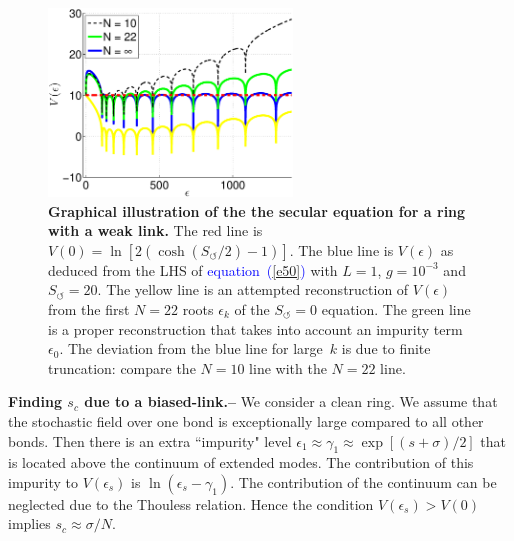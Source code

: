 \documentclass[aps,pre,floats,floatfix,twocolumn]{revtex4}
\newcommand{\Eq}[1]{\textcolor{blue}{{equation}\!~(\ref{#1})}}
\newcommand{\sect}[1]{{\bf #1.-- }}
\begin{document}
\begin{figure}

\includegraphics[height=5cm]{gRing_ES_vs_cont}

\caption{\label{figReconstruction} 
{\bf Graphical illustration of the the secular equation for a ring with a weak link.} 
The red line is $V(0)=\ln[2(\cosh(S_{\circlearrowleft}/2)-1)]$. 
The blue line is $V(\epsilon)$ as deduced from the LHS of \Eq{e50}
with ${L=1}$, ${g=10^{-3}}$ and ${S_{\circlearrowleft}=20}$.
The yellow line is an attempted reconstruction of $V(\epsilon)$ 
from the first $N=22$ roots $\epsilon_k$ of the $S_{\circlearrowleft}{=}0$ equation. 
The green line is a proper reconstruction that takes into account 
an impurity term $\epsilon_0$. The deviation from the blue line 
for large~$k$ is due to finite truncation: compare the ${N{=}10}$ line with the ${N{=}22}$ line. 
}
\end{figure}




\sect{Finding $s_c$ due to a biased-link}
%
We consider a clean ring. We assume that the stochastic field 
over one bond is exceptionally large compared to all other bonds.   
Then there is an extra ``impurity" level  
${\epsilon_1 \approx \gamma_1 \approx \exp[(s+\sigma)/2]}$ 
that is located above the continuum of extended modes. 
The contribution of this impurity to $V(\epsilon_s)$ 
is $\ln(\epsilon_s-\gamma_1)$. 
The contribution of the continuum can be neglected 
due to the Thouless relation. 
Hence the condition ${V(\epsilon_s)>V(0)}$ 
implies $s_c \approx \sigma/N$. 
\\     
\end{document}
